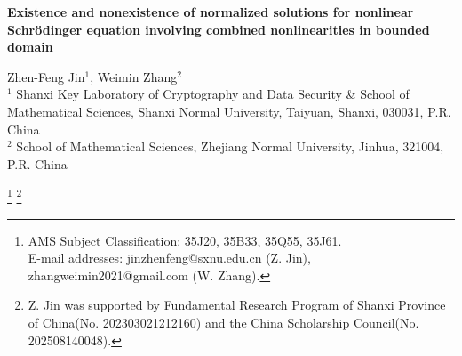 \documentclass[10pt]{article}
\numberwithin{equation}{section}
\renewcommand\theequation{\thesection.\arabic{equation}}
\numberwithin{equation}{section}
\begin{document}
\begin{center}
\textbf{Existence and nonexistence of normalized solutions for nonlinear Schr\"{o}dinger equation involving combined nonlinearities  in bounded domain}\\
\end{center}

\begin{center}
{ Zhen-Feng Jin$^{1}$, Weimin Zhang$^{2}$\\

$^{1}$ Shanxi Key Laboratory of Cryptography and Data Security \& School of Mathematical Sciences, Shanxi Normal University, Taiyuan, Shanxi, 030031, P.R. China\\
\smallskip
$^{2}$ School of Mathematical Sciences, Zhejiang Normal University, Jinhua, 321004, P.R. China
\smallskip
}


\end{center}
\begin{center}
\renewcommand{\theequation}{\arabic{section}.\arabic{equation}}
\footnote[0]{\hspace*{-7.4mm}
AMS Subject Classification: 35J20, 35B33, 35Q55, 35J61.\\
{E-mail addresses: jinzhenfeng@sxnu.edu.cn (Z. Jin), zhangweimin2021@gmail.com (W. Zhang).}}
\footnote[0]{\hspace{-7.4mm}
{ Z. Jin was supported by Fundamental Research Program of Shanxi Province of China(No. 202303021212160) and the China Scholarship Council(No. 202508140048).}}
\end{center}
\end{document}
